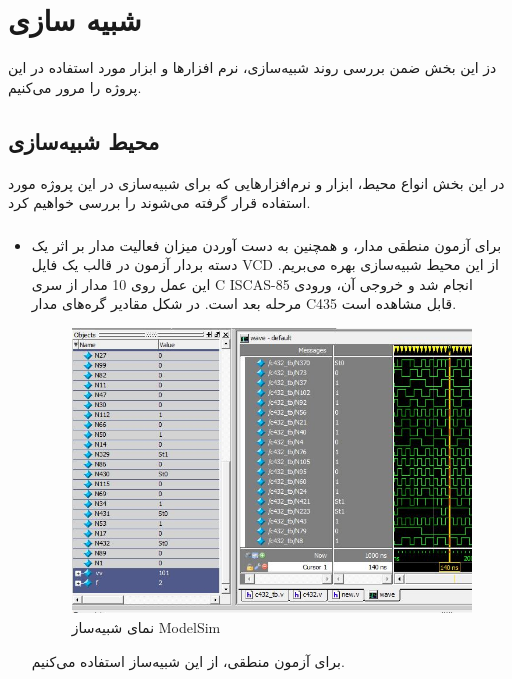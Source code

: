 \section{شبیه سازی}\label{section_simluation}
دز این بخش ضمن بررسی روند شبیه‌سازی، نرم افزار‌ها و ابزار مورد استفاده در این پروژه را مرور می‌کنیم.
\subsection{محیط شبیه‌سازی}
در این بخش انواع محیط، ابزار و نرم‌افزارهایی که برای شبیه‌سازی در این پروژه مورد استفاده قرار گرفته می‌شوند را بررسی خواهیم کرد.
\begin{itemize}
	
	\item \subsubsection{}
	برای آزمون منطقی مدار، و همچنین به دست آوردن میزان فعالیت مدار بر اثر یک دسته بردار آزمون در قالب یک فایل VCD از این محیط شبیه‌سازی بهره می‌بریم. این عمل روی 10 مدار از سری C ISCAS-85 انجام شد و خروجی آن، ورودی مرحله بعد است. در شکل مقادیر گره‌های  مدار C435 قابل مشاهده است.
	\begin{figure}[H]
		\begin{center}
			\includegraphics[scale=0.6]{figs/modelsim.jpg}
			\caption{نمای شبیه‌ساز ModelSim} 
			\label{fig1}
		\end{center}
	\end{figure}
	برای آزمون منطقی، از این شبیه‌ساز استفاده می‌کنیم.
	
	
	

\end{itemize}
